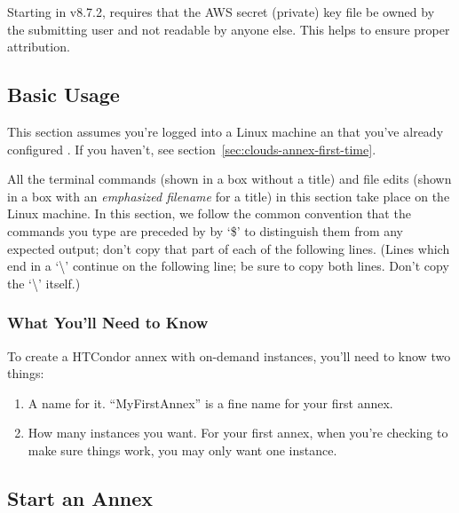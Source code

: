 Starting in v8.7.2,  requires that the AWS secret (private) key file
be owned by the submitting user and not readable by anyone else.  This
helps to ensure proper attribution.

\subsection{Basic Usage}


This section assumes you're logged into a Linux machine an that you've
already configured .  If you haven't, see
section~\ref{sec:clouds-annex-first-time}.

All the terminal commands (shown in a box without a title) and file edits
(shown in a box with an \emph{emphasized filename} for a title) in this
section take place on the Linux machine.  In this section, we follow the
common convention that the commands you type are preceded by by `\$'
to distinguish them from any expected output; don't copy that part of each
of the following lines.  (Lines which end in a `\textbackslash' continue on
the following line; be sure to copy both lines.  Don't copy the
`\textbackslash' itself.)

\subsubsection{What You'll Need to Know}

To create a HTCondor annex with on-demand instances, you'll need to know two
things:

\begin{enumerate}
\item A name for it.  ``MyFirstAnnex'' is a fine name for your first annex.
\item How many instances you want.  For your first annex, when you're checking to make sure things work, you may only want one instance.
\end{enumerate}

\subsection{Start an Annex}

